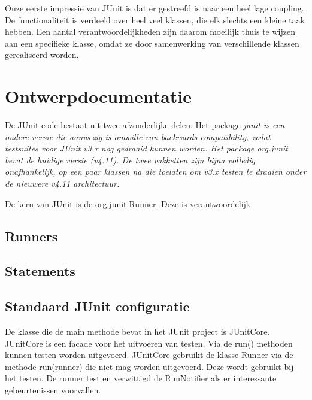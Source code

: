 \documentclass[i1]{oss}
\begin{document}
Onze eerste impressie van JUnit is dat er gestreefd is naar een heel lage coupling. De functionaliteit is verdeeld over heel veel klassen, die elk slechts een kleine taak hebben. Een aantal verantwoordelijkheden zijn daarom moeilijk thuis te wijzen aan een specifieke klasse, omdat ze door samenwerking van verschillende klassen gerealiseerd worden.

\section{Ontwerpdocumentatie}

De JUnit-code bestaat uit twee afzonderlijke delen. Het package \em{junit} is een oudere versie die aanwezig is omwille van backwards compatibility, zodat testsuites voor JUnit v3.x nog gedraaid kunnen worden. Het package \em{org.junit} bevat de huidige versie (v4.11). De twee pakketten zijn bijna volledig onafhankelijk, op een paar klassen na die toelaten om v3.x testen te draaien onder de nieuwere v4.11 architectuur.

De kern van JUnit is de org.junit.Runner. Deze is verantwoordelijk 

\subsection{Runners}

\subsection{Statements}

\subsection{}

\subsection{Standaard JUnit configuratie}

De klasse die de main methode bevat in het JUnit project is JUnitCore. JUnitCore is een facade voor het uitvoeren van testen. Via de run() methoden kunnen testen worden uitgevoerd. JUnitCore gebruikt de klasse Runner via de methode run(runner) die niet mag worden uitgevoerd. Deze wordt gebruikt bij het testen. De runner test en verwittigd de RunNotifier als er interessante gebeurtenissen voorvallen. 
\end{document}
